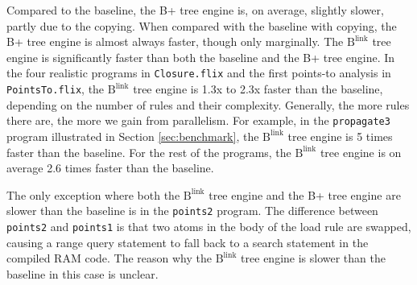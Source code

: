 \documentclass[11pt]{report}
\theoremstyle{definition}
\begin{document}
Compared to the baseline, the B+ tree engine is, on average, slightly slower, partly due to the copying. When compared with the baseline with copying, the B+ tree engine is almost always faster, though only marginally. The $\text{B}^{\text{link}}$ tree engine is significantly faster than both the baseline and the B+ tree engine. In the four realistic programs in \texttt{Closure.flix} and the first points-to analysis in \texttt{PointsTo.flix}, the $\text{B}^{\text{link}}$ tree engine is 1.3x to 2.3x faster than the baseline, depending on the number of rules and their complexity. Generally, the more rules there are, the more we gain from parallelism. For example, in the \texttt{propagate3} program illustrated in Section \ref{sec:benchmark}, the $\text{B}^{\text{link}}$ tree engine is 5 times faster than the baseline. For the rest of the programs, the $\text{B}^{\text{link}}$ tree engine is on average 2.6 times faster than the baseline.

The only exception where both the $\text{B}^{\text{link}}$ tree engine and the B+ tree engine are slower than the baseline is in the \texttt{points2} program. The difference between \texttt{points2} and \texttt{points1} is that two atoms in the body of the load rule are swapped, causing a range query statement to fall back to a search statement in the compiled RAM code. The reason why the $\text{B}^{\text{link}}$ tree engine is slower than the baseline in this case is unclear.
\end{document}
